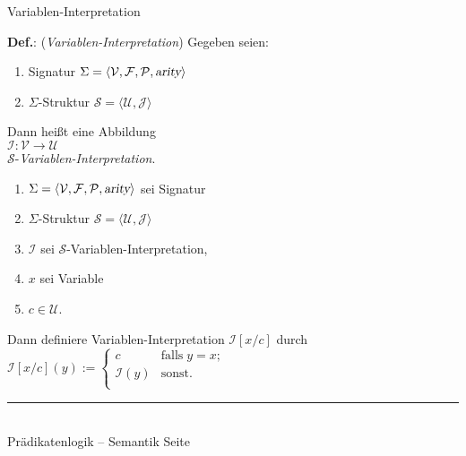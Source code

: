 \documentclass{slides}
\newcommand{\myrule}{\rule{20cm}{1mm}\\ }
\newcommand{\struct}{\mathcal{S}}
\newcounter{mypage}
\begin{document}
\begin{slide}{}
\normalsize
\begin{center}
Variablen-Interpretation
\end{center}
\vspace{0.5cm}

\footnotesize
\textbf{Def.}: (\emph{Variablen-Interpretation}) \quad Gegeben seien:
\begin{enumerate}
\item Signatur \quad
      $\Sigma = \langle \mathcal{V}, \mathcal{F}, \mathcal{P}, \textsl{arity} \rangle$ 
\item $\Sigma$-Struktur \quad $\struct = \langle \mathcal{U}, \mathcal{J} \rangle$ 
\end{enumerate}
Dann heißt eine Abbildung \\[0.3cm]
\hspace*{1.3cm} $\mathcal{I}: \mathcal{V} \rightarrow \mathcal{U}$ \\[0.3cm]
$\struct$-\emph{Variablen-Interpretation}.

\begin{enumerate}
\item $\Sigma = \langle \mathcal{V}, \mathcal{F}, \mathcal{P}, \textsl{arity} \rangle$ 
      sei Signatur
\item $\Sigma$-Struktur $\struct = \langle \mathcal{U}, \mathcal{J} \rangle$ 
\item $\mathcal{I}$ sei $\struct$-Variablen-Interpretation,

\item $x$ sei Variable 
\item $c \in \mathcal{U}$.
\end{enumerate}
Dann definiere Variablen-Interpretation $\mathcal{I}[x/c]$ durch \\[0.1cm]
\hspace*{1.3cm} 
    $\mathcal{I}[x/c](y) := \left\{
    \begin{array}{ll}
    c               & \mbox{falls}\; y = x;  \\
    \mathcal{I}(y)  & \mbox{sonst}.          \\
    \end{array}
    \right.$ 

\vspace*{\fill}
\tiny \addtocounter{mypage}{1}
\myrule
Pr\"{a}dikatenlogik -- Semantik  \hspace*{\fill} Seite 
\end{slide}

\end{document}
